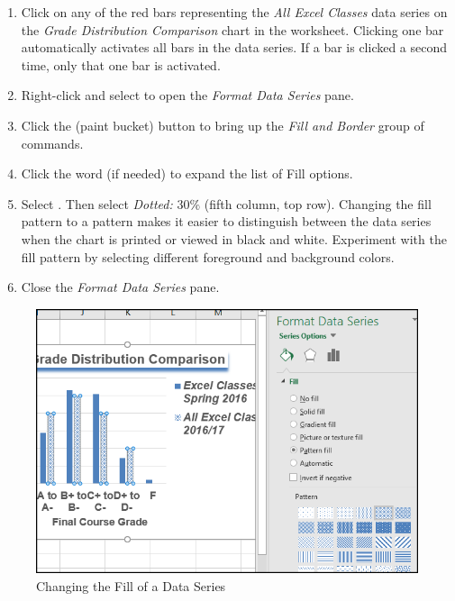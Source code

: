 \begin{enumbox}
	\begin{enumerate}
		\item Click on any of the red bars representing the \textit{All Excel Classes} data series on the \textit{Grade Distribution Comparison} chart in the  worksheet. Clicking one bar automatically activates all bars in the data series. If a bar is clicked a second time, only that one bar is activated.
		\item Right-click and select  to open the \textit{Format Data Series} pane.
		\item Click the  (paint bucket) button to bring up the \textit{Fill and Border} group of commands.
		\item Click the word  (if needed) to expand the list of Fill options.
		\item Select . Then select \textit{Dotted: }$ 30\% $ (fifth column, top row). Changing the fill pattern to a pattern makes it easier to distinguish between the data series when the chart is printed or viewed in black and white. Experiment with the fill pattern by selecting different foreground and background colors.
		\item Close the \textit{Format Data Series} pane.
	\end{enumerate}
\end{enumbox}
	
\begin{figure}[H]
	\centering
	\includegraphics[width=\maxwidth{.95\linewidth}]{gfx/ch04_fig37}
	\caption{Changing the Fill of a Data Series}
	\label{04:fig37}
\end{figure}

